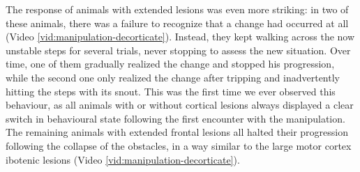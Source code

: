 The response of animals with extended lesions was even more striking: in two of these animals, there was a failure to recognize that a change had occurred at all (Video \ref{vid:manipulation-decorticate}). Instead, they kept walking across the now unstable steps for several trials, never stopping to assess the new situation. Over time, one of them gradually realized the change and stopped his progression, while the second one only realized the change after tripping and inadvertently hitting the steps with its snout. This was the first time we ever observed this behaviour, as all animals with or without cortical lesions always displayed a clear switch in behavioural state following the first encounter with the manipulation. The remaining animals with extended frontal lesions all halted their progression following the collapse of the obstacles, in a way similar to the large motor cortex ibotenic lesions (Video \ref{vid:manipulation-decorticate}).
